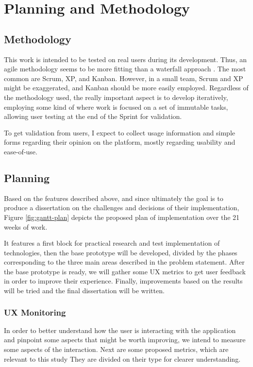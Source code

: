 \chapter{Planning and Methodology}\label{chap:problem-planning}

\section{Methodology}\label{sec:prob-methodology}

This work is intended to be tested on real users during its development. Thus, an agile methodology seems to be more fitting than a waterfall approach \cite{beck2001agile}. The most common are Scrum, XP, and Kanban. However, in a small team, Scrum and XP might be exaggerated, and Kanban should be more easily employed. Regardless of the methodology used, the really important aspect is to develop iteratively, employing some kind of  where work is focused on a set of immutable tasks, allowing user testing at the end of the Sprint for validation. 

To get validation from users, I expect to collect usage information and simple forms regarding their opinion on the platform, mostly regarding usability and ease-of-use. 

\section{Planning}\label{sec:prob-planning}

Based on the features described above, and since ultimately the goal is to produce a dissertation on the challenges and decisions of their implementation, Figure \ref{fig:gantt-plan} depicts the proposed plan of implementation over the 21 weeks of work.

It features a first block for practical research and test implementation of technologies, then the base prototype will be developed, divided by the phases corresponding to the three main areas described in the problem statement. After the base prototype is ready, we will gather some UX metrics to get user feedback in order to improve their experience. Finally, improvements based on the results will be tried and the final dissertation will be written.

\subsection{UX Monitoring}

In order to better understand how the user is interacting with the application and pinpoint some aspects that might be worth improving, we intend to measure some aspects of the interaction. Next are some proposed metrics, which are relevant to this study They are divided on their type for clearer understanding.

